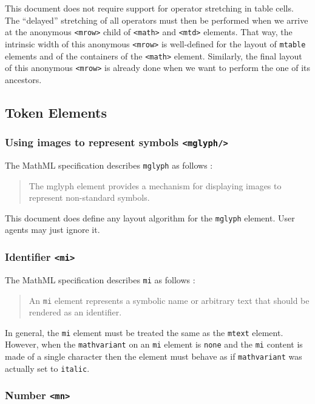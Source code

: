 This document does not require support for operator stretching in table cells.
The ``delayed'' stretching of all operators must then be performed when we
arrive at the anonymous {\tt <mrow>} child of {\tt <math>} and {\tt <mtd>}
elements.
That way, the intrinsic width of this anonymous {\tt <mrow>} is well-defined
for the layout of {\tt mtable} elements and of the containers of the
{\tt <math>} element. Similarly, the final layout of this anonymous
{\tt <mrow>} is already done when we want to perform the one of its ancestors.

\subsection{Token Elements}

\subsubsection{Using images to represent symbols {\tt <mglyph/>}}

The MathML specification describes {\tt mglyph} as follows \cite{MathML3}:
%
\begin{quote}
The mglyph element provides a mechanism for displaying images to represent
non-standard symbols.
\end{quote}

This document does define any layout algorithm for the {\tt mglyph}
element. User agents may just ignore it.

\subsubsection{Identifier {\tt <mi>}}\label{Identifier}

The MathML specification describes {\tt mi} as follows \cite{MathML3}:
%
\begin{quote}
  An {\tt mi} element represents a symbolic name or arbitrary text that should
  be rendered as an identifier.
\end{quote}

In general, the {\tt mi} element must be treated the same as the {\tt mtext}
element. However, when the {\tt mathvariant} on an {\tt mi} element is
{\tt none} and the {\tt mi} content is made of a single character then the
element must behave as if {\tt mathvariant} was actually set to {\tt italic}.

\subsubsection{Number {\tt <mn>}}


